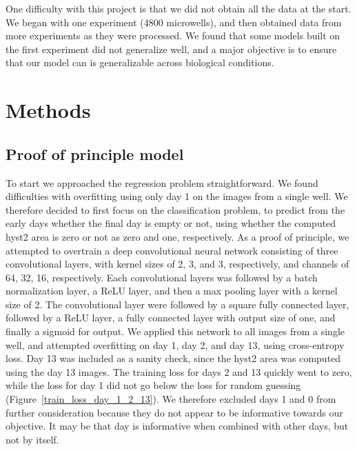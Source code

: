 \documentclass[10pt,twocolumn,letterpaper]{article}
\begin{document}
One difficulty with this project is that we did not obtain all the data at the start.  We began with one experiment (4800 microwells), and then obtained data from more experiments as they were processed.   We found that some models built on the first experiment did not generalize well, and a major objective is to ensure that our model can is generalizable across biological conditions.




 \section{Methods}
 
 \subsection{Proof of principle model}
 
 To start we approached the regression problem straightforward.  We found difficulties with overfitting using only day 1 on the images from a single well.  We therefore decided to first focus on the classification problem, to predict from the early days whether the final day is empty or not, using whether the computed hyst2 area is zero or not as zero and one, respectively.   As a proof of principle, we attempted to overtrain a deep convolutional neural network consisting of three convolutional layers, with kernel sizes of 2, 3, and 3, respectively, and channels of 64, 32, 16, respectively.  Each convolutional layers was followed by a batch normalization layer, a ReLU layer, and then a max pooling layer with a kernel size of 2.  The convolutional layer were followed by a square fully connected layer, followed by a ReLU layer, a fully connected layer with output size of one, and finally a sigmoid for output.  We applied this network to all images from a single well, and attempted overfitting on day 1, day 2, and day 13, using cross-entropy loss.  Day 13 was included as a sanity check, since the hyst2 area was computed using the day 13 images.  The training loss for days 2 and 13 quickly went to zero, while the loss for day 1 did not go below the loss for random guessing (Figure~\ref{train_loss_day_1_2_13}).  We therefore excluded days 1 and 0 from further consideration because they do not appear to be informative towards our objective.  It may be that day is informative when combined with other days, but not by itself.
 
\end{document}
